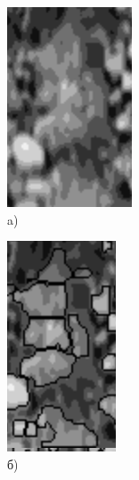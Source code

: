 \documentclass[times]{itmo-student-thesis}
\begin{document}
\begin{figure}[h!]
	\begin{minipage}[h]{0.3\linewidth}
		\centering
		\includegraphics[width=0.5\linewidth]{images/source} \\ a)
	\end{minipage}
	\hfill
	\begin{minipage}[h]{0.3\linewidth}
		\centering
		\includegraphics[width=0.5\linewidth]{images/water} \\ б)

\end{minipage}
\end{figure}
\end{document}
